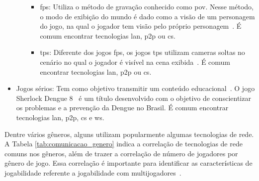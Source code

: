 \begin{itemize}
\begin{itemize}
        \begin{itemize}
          \item \ac{fps}: Utiliza o método de gravação conhecido como \ac{pov}. Nesse método, o modo de exibição do mundo é dado como a visão de um personagem do jogo, na qual o jogador tem visão pelo próprio personagem~\cite{video_game_technologies, adams_1208533}. É comum encontrar tecnologias \ac{lan}, \ac{p2p} ou \ac{cs}.
          \item \ac{tps}: Diferente dos jogos \ac{fps}, os jogos \ac{tps} utilizam cameras soltas no cenário no qual o jogador é visível na cena exibida~\cite{video_game_technologies, adams_1208533}. É comum encontrar tecnologias \ac{lan}, \ac{p2p} ou \ac{cs}.
        \end{itemize}
    \end{itemize}
  \item Jogos sérios: Tem como objetivo transmitir um conteúdo educacional~\cite{video_game_technologies}. O jogo Sherlock Dengue 8~\cite{sherlock_dengue} é um título desenvolvido com o objetivo de conscientizar os problemas e a prevenção da Dengue no Brasil. É comum encontrar tecnologias \ac{lan}, \ac{p2p}, \ac{cs} e \ac{ws}.
\end{itemize}



Dentre vários gêneros, alguns utilizam popularmente algumas tecnologias de rede.
%
A Tabela \ref{tab:comunicacao_genero} indica a correlação de tecnologias de rede comuns nos gêneros, além de trazer a correlação de número de jogadores por gênero de jogo.
%
Essa correlação é importante para identificar as características de jogabilidade referente a jogabilidade com multijogadores~\cite{video_game_technologies}.


